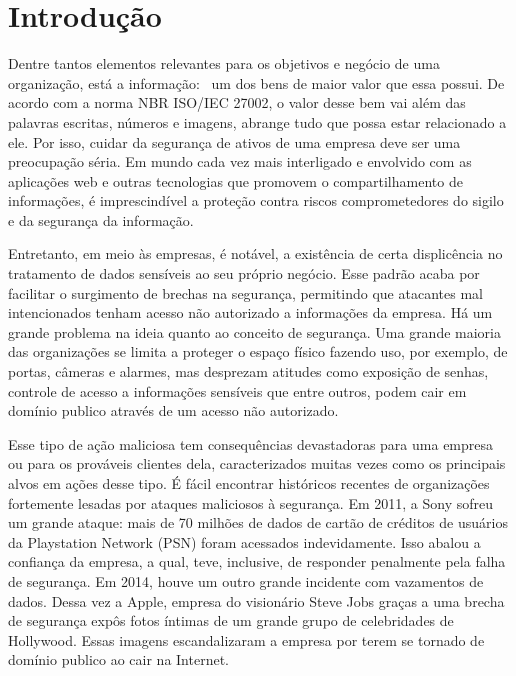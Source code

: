 \documentclass[
    12pt,               %
    openright,          %
    oneside,            %
    a4paper,            %
    section=TITLE,     %
    english,            %
    french,             %
    spanish,            %
    brazil              %
    ]{abntex2}
\newcommand{\citep}{\cite}
\begin{document}







\cleardoublepage
\tableofcontents*
\cleardoublepage


\textual



\chapter{Introdução}

Dentre tantos elementos relevantes para os objetivos e negócio de uma organização, está a informação:~ um dos bens de maior valor que essa possui. De acordo com a norma NBR ISO/IEC 27002\citep{62241}, o valor desse bem vai além das palavras escritas, números e imagens, abrange tudo que possa estar relacionado a ele. Por isso, cuidar da segurança de ativos de uma empresa deve ser uma preocupação séria. Em mundo cada vez mais interligado e envolvido com as aplicações web e outras tecnologias que promovem o compartilhamento de informações, é imprescindível a proteção contra riscos comprometedores do sigilo e da segurança da informação.


Entretanto, em meio às empresas, é notável, a existência de certa displicência no tratamento de dados sensíveis ao seu próprio negócio. Esse padrão acaba por facilitar o surgimento de brechas na segurança, permitindo que atacantes mal intencionados tenham acesso não autorizado a informações da empresa. Há um grande problema na ideia quanto ao conceito de segurança. Uma grande maioria das organizações se limita a proteger o espaço físico fazendo uso, por exemplo, de portas, câmeras e alarmes, mas desprezam atitudes como exposição de senhas, controle de acesso a informações sensíveis que entre outros, podem cair em domínio publico através de um acesso não autorizado.


Esse tipo de ação maliciosa tem consequências devastadoras para uma empresa ou para os prováveis clientes dela, caracterizados muitas vezes como os principais alvos em ações desse tipo. É fácil encontrar históricos recentes de organizações fortemente lesadas por ataques maliciosos à segurança. Em 2011, a Sony sofreu um grande ataque: mais de 70 milhões de dados de cartão de créditos de usuários da Playstation Network (PSN) foram acessados indevidamente\citep{62949}. Isso abalou a confiança da empresa, a qual, teve, inclusive, de responder penalmente pela falha de segurança\citep{62951}. Em 2014, houve um outro grande incidente com vazamentos de dados. Dessa vez a Apple, empresa do visionário Steve Jobs graças a uma brecha de segurança expôs fotos íntimas de um grande grupo de celebridades de Hollywood\citep{62948}. Essas imagens escandalizaram a empresa por terem se tornado de domínio publico ao cair na Internet.
\end{document}
